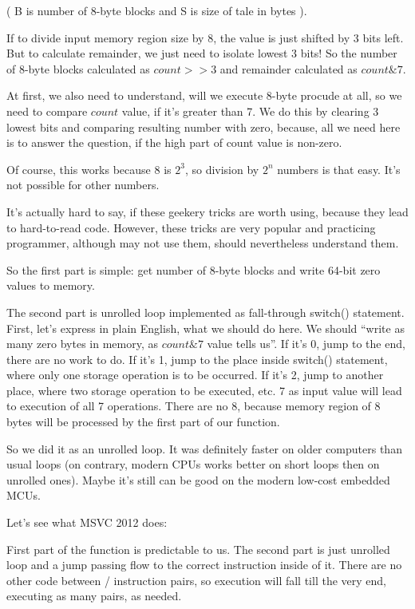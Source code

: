( B is number of 8-byte blocks and S is size of tale in bytes ).

If to divide input memory region size by 8, the value is just shifted by 3 bits left.
But to calculate remainder, we just need to isolate lowest 3 bits!
So the number of 8-byte blocks calculated as $count>>3$ and remainder calculated as 
$count \& 7$.

At first, we also need to understand, will we execute 8-byte procude at all, so we need
to compare $count$ value, if it's greater than 7.
We do this by clearing 3 lowest bits and comparing resulting number with zero, because, 
all we need here is to answer the question, if the high part of count value is non-zero.

Of course, this works because 8 is $2^{3}$, so division by $2^n$ numbers is that easy. 
It's not possible for other numbers.

It's actually hard to say, if these geekery tricks are worth using, because they lead
to hard-to-read code. 
However, these tricks are very popular and practicing programmer, 
although may not use them, should nevertheless understand them.

So the first part is simple: get number of 8-byte blocks and write 64-bit zero values to memory.

The second part is unrolled loop implemented as fall-through switch() statement.
First, let's express in plain English, what we should do here. 
We should ``write as many zero bytes in memory, as $count\&7$ value tells us''.
If it's 0, jump to the end, there are no work to do.
If it's 1, jump to the place inside switch() statement, where only one storage operation
is to be occurred.
If it's 2, jump to another place, where two storage operation to be executed, etc.
7 as input value will lead to execution of all 7 operations.
There are no 8, because memory region of 8 bytes will be processed by the first part of our
function.

So we did it as an unrolled loop. 
It was definitely faster on older computers than usual loops (on contrary, 
modern CPUs works better on short loops then on unrolled ones). 
Maybe it's still can be good on the modern low-cost embedded \ac{MCU}s.

Let's see what \Optimizing MSVC 2012 does:



First part of the function is predictable to us.
The second part is just unrolled loop and a jump passing flow to the correct instruction
inside of it. 
There are no other code between / instruction pairs, 
so execution will fall till the very end, executing as many pairs, as needed.

